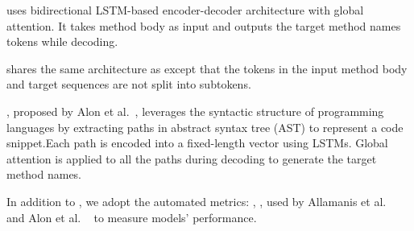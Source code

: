  uses bidirectional LSTM-based encoder-decoder
architecture with global attention. It takes method body as input and
outputs the target method names tokens while decoding.

 shares the same architecture as
 except that the tokens in the input method body
and target sequences are not split into subtokens.


, proposed by Alon et
al.~\cite{AlonETAL19code2seq}, leverages the syntactic structure of
programming languages by extracting paths in abstract syntax tree
(AST) to represent a code snippet.Each path is encoded into a
fixed-length vector using LSTMs. Global attention is applied to all
the paths during decoding to generate the target method names.

 In addition to \xmatch, we adopt the
automated metrics: \fone, \precision, \recall used by Allamanis et
al.~\cite{AllamanisETAL16Convolutional} and Alon et
al. ~\cite{AlonETAL19code2seq} to measure models' performance.









